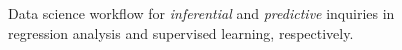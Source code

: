 \documentclass[
  letterpaper,
  DIV=11,
  numbers=noendperiod]{scrreprt}
\begin{document}
\begin{figure}


\caption{\label{fig-ds-workflow}Data science workflow for
\emph{inferential} and \emph{predictive} inquiries in regression
analysis and supervised learning, respectively.}

\end{figure}%
\end{document}
